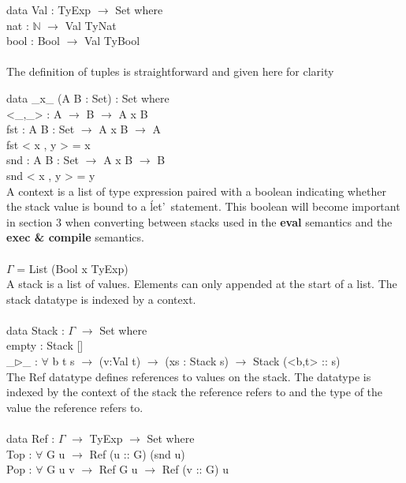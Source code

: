 \documentclass[paper=a4, fontsize=11pt]{scrartcl} %
\numberwithin{equation}{section} %
\numberwithin{figure}{section} %
\numberwithin{table}{section} %
\begin{document}
data Val : TyExp $\rightarrow$ Set where\\
  nat : $\mathbb{N}$ $\rightarrow$ Val TyNat\\
  bool : Bool $\rightarrow$ Val TyBool\\
  \\
\normalfont
The definition of tuples is straightforward and given here for clarity \\
\ttfamily

data \_x\_ (A B : Set) : Set where\\
  <\_,\_> : A $\rightarrow$ B $\rightarrow$ A x B\\

fst : {A B : Set} $\rightarrow$ A x B $\rightarrow$ A\\
fst < x , y > = x\\

snd : {A B : Set} $\rightarrow$ A x B $\rightarrow$ B\\
snd < x , y > = y\\

\normalfont
A context is a list of type expression paired with a boolean indicating whether the stack value is bound to a \'let'\ statement. This boolean will become important in section 3 when converting between stacks used in the \textbf{eval} semantics and the \textbf{exec \& compile} semantics.  \\
\ttfamily
\\
$\Gamma$ = List (Bool x TyExp)\\

\normalfont
A stack is a list of values. Elements can only appended at the start of a list. The stack datatype is indexed by a context.\\
\ttfamily
\\
data Stack : $\Gamma$ $\rightarrow$ Set where\\
  empty : Stack []\\
  \_$\rhd$\_ : $\forall$ {b t s} $\rightarrow$ (v:Val t) $\rightarrow$ (xs : Stack s) $\rightarrow$ Stack (<b,t> :: s)\\
  
\normalfont
The Ref datatype defines references to values on the stack. The datatype is indexed by the context of the stack the reference refers to and the type of the value the reference refers to.\\
\ttfamily
\\
data Ref : $\Gamma$ $\rightarrow$ TyExp $\rightarrow$ Set where\\
 Top : $\forall$ {G u} $\rightarrow$ Ref (u :: G) (snd u)\\
 Pop : $\forall$ {G u v} $\rightarrow$ Ref G u $\rightarrow$ Ref (v :: G) u\\
\normalfont
\end{document}
